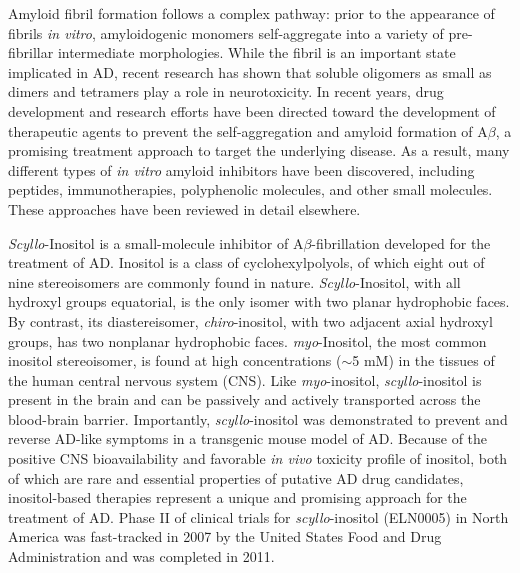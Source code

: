 Amyloid fibril formation follows a complex pathway: prior to the appearance of fibrils \emph{in vitro}, amyloidogenic monomers self-aggregate into a variety of pre-fibrillar intermediate morphologies. While the fibril is an important state implicated in AD, recent research has shown that soluble oligomers as small as dimers and tetramers play a role in neurotoxicity.\cite{Bernstein:2009p165} In recent years, drug development and research efforts have been directed toward the development of therapeutic agents to prevent the self-aggregation and amyloid formation of A$\beta$, a promising treatment approach to target the underlying disease.\cite{Masters:2006p183,Citron:2010p214,Dasilva:2010p25} As a result, many different types of \emph{in vitro} amyloid inhibitors have been discovered, including peptides,\cite{EsterasChopo:2008p219,Sciarretta:2006p181,Chalifour:2003p161,Scrocchi:2002p178,Soto:2007dm} immunotherapies,\cite{Janus:2000p198,Solomon:2010p177} polyphenolic molecules,\cite{Masuda:2009p205,Berhanu:2010p230,Ehrnhoefer:2008p8} and other small molecules.\cite{Hawkes:2009p189,Masuda:2009p205,Necula:2007p227,Nitz:2008p13} These approaches have been reviewed in detail elsewhere.\cite{Citron:2010p214,Dasilva:2010p25}

\emph{Scyllo}-Inositol is a small-molecule inhibitor of A$\beta$-fibrillation developed for the treatment of AD.\cite{McLaurin:2006p29,McLaurin:2000p64,Fenili:2007p182,Ma:2012jk} Inositol is a class of cyclohexylpolyols, of which eight out of nine stereoisomers are commonly found in nature. \emph{Scyllo}-Inositol, with all hydroxyl groups equatorial,  is the only isomer with two planar hydrophobic faces. By contrast, its diastereisomer, \emph{chiro}-inositol, with two adjacent axial hydroxyl groups, has two nonplanar  hydrophobic faces. \emph{myo}-Inositol, the most common inositol stereoisomer, is found at high concentrations ($\sim$5 mM) in the tissues of the human central nervous system (CNS).\cite{Fisher:2002p62} Like \emph{myo}-inositol, \emph{scyllo}-inositol is present in the brain and can be passively and actively transported across the blood-brain barrier.\cite{Fenili:2007p182} Importantly, \emph{scyllo}-inositol was demonstrated to prevent and reverse AD-like symptoms in a transgenic mouse model of AD.\cite{McLaurin:2006p29} Because of the positive CNS bioavailability and favorable \emph{in vivo} toxicity profile of inositol, both of which are rare and essential properties of putative AD drug candidates, inositol-based therapies represent a unique and promising approach for the treatment of AD. Phase II of clinical trials for \emph{scyllo}-inositol (ELN0005) in North America was fast-tracked in 2007 by the United States Food and Drug Administration and was completed in 2011.\cite{Salloway:2011im,Ma:2012jk}

